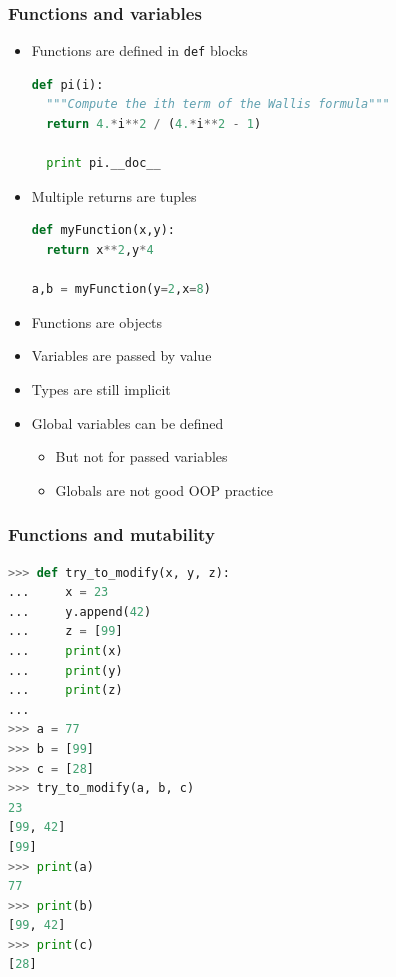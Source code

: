 \documentclass[xcolor=table,10pt,final]{beamer}
\begin{document}
\begin{frame}[fragile]
  \frametitle{Functions and variables}
  \begin{itemize}
    \item Functions are defined in {\tt def} blocks\\
      \begin{lstlisting}[language=python]
def pi(i):
  """Compute the ith term of the Wallis formula"""
  return 4.*i**2 / (4.*i**2 - 1)

  print pi.__doc__
      \end{lstlisting}
    \item Multiple returns are tuples\\
      \begin{lstlisting}[language=python]
def myFunction(x,y):
  return x**2,y*4

a,b = myFunction(y=2,x=8)
      \end{lstlisting}
    \item Functions are objects
    \item Variables are passed by value
    \item Types are still implicit
    \item Global variables can be defined
      \begin{itemize}
        \item But not for passed variables
        \item Globals are not good OOP practice
      \end{itemize}
  \end{itemize}
\end{frame}

\begin{frame}[fragile]
  \frametitle{Functions and mutability}
  \begin{lstlisting}[language=python]
>>> def try_to_modify(x, y, z):
...     x = 23
...     y.append(42)
...     z = [99]
...     print(x)
...     print(y)
...     print(z)
...
>>> a = 77
>>> b = [99]
>>> c = [28]
>>> try_to_modify(a, b, c)
23
[99, 42]
[99]
>>> print(a)
77
>>> print(b)
[99, 42]
>>> print(c)
[28]
  \end{lstlisting}
\end{frame}
\end{document}
